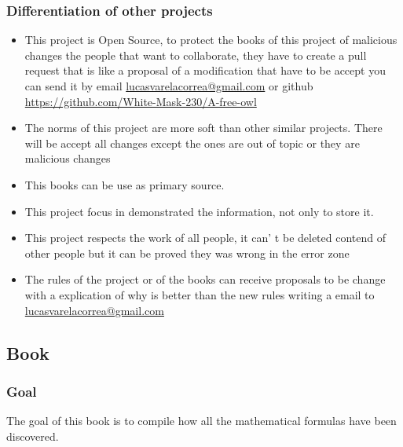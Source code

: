 \documentclass{book}
\begin{document}
                \subsubsection{Differentiation of other projects}
                    \begin{itemize}
                        \item This project is Open Source, to protect the books of this project of malicious changes the people that want to collaborate, they have to create a pull request that is like a proposal of a modification that have to be accept you can send it by email \url{lucasvarelacorrea@gmail.com} or github \url{https://github.com/White-Mask-230/A-free-owl}

                        \item The norms of this project are more soft than other similar projects. There will be accept all changes except the ones are out of topic or they are malicious changes

                        \item This books can be use as primary source.

                        \item This project focus in demonstrated the information, not only to store it.

                        \item This project respects the work of all people, it can' t be deleted contend of other people but it can be proved they was wrong in the error zone

                        \item The rules of the project or of the books can receive proposals to be change with a explication of why is better than the new rules writing a email to \url{lucasvarelacorrea@gmail.com}
                    \end{itemize}

            \subsection{Book}
                \subsubsection{Goal}
                    The goal of this book is to compile how all the mathematical formulas have been discovered.
\end{document}
